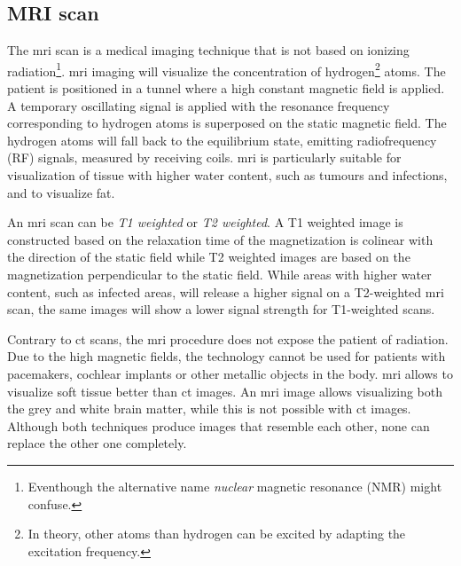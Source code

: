 \subsection{MRI scan}
\par{
    The \acrfull{mri} scan is a medical imaging technique that is not based on ionizing radiation\footnote{Eventhough the alternative name \textit{nuclear} magnetic resonance (NMR) might confuse.}.
    \acrshort{mri} imaging will visualize the concentration of hydrogen\footnote{In theory, other atoms than hydrogen can be excited by adapting the excitation frequency.} atoms.
    The patient is positioned in a tunnel where a high constant magnetic field is applied. 
    A temporary oscillating signal is applied with the resonance frequency corresponding to hydrogen atoms is superposed on the static magnetic field.
    The hydrogen atoms will fall back to the equilibrium state, emitting radiofrequency (RF) signals, measured by receiving coils.
    \acrlong{mri} is particularly suitable for visualization of tissue with higher water content, such as tumours and infections, and to visualize fat.
}
\par{
    An \acrshort{mri} scan can be \textit{T1 weighted} or \textit{T2 weighted}. 
    A T1 weighted image is constructed based on the relaxation time of the magnetization is colinear with the direction of the static field
    while T2 weighted images are based on the magnetization perpendicular to the static field.
    While areas with higher water content, such as infected areas, will release a higher signal on a T2-weighted \acrshort{mri} scan, the same images will show a lower signal strength for T1-weighted scans.
}
\par{
    Contrary to \acrfull{ct} scans, the \acrlong{mri} procedure does not expose the patient of radiation. 
    Due to the high magnetic fields, the technology cannot be used for patients with pacemakers, cochlear implants or other metallic objects in the body.
    \acrshort{mri} allows to visualize soft tissue better than \acrshort{ct} images. An \acrshort{mri} image allows visualizing both the grey and white brain matter, while this is not possible with \acrshort{ct} images.
    Although both techniques produce images that resemble each other, none can replace the other one completely.
}

